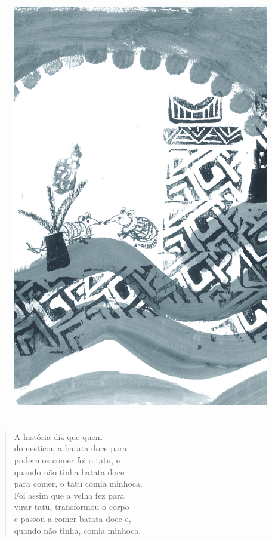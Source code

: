 \pagebreak
\thispagestyle{empty}
\begin{figure}
\vspace*{-1.6cm}
\hspace*{-2.2cm}\includegraphics[width=138mm]{./imgs/img12.jpg}
\end{figure}

\chapter*{}

\mbox{}\vspace*{\fill}

\begin{verse}
A história diz que quem\\
domesticou a batata doce para\\
podermos comer foi o tatu, e\\
quando não tinha batata doce\\
para comer, o tatu comia minhoca.\\
Foi assim que a velha fez para\\
virar tatu, transformou o corpo\\
e passou a comer batata doce e,\\
quando não tinha, comia minhoca.
\end{verse}

